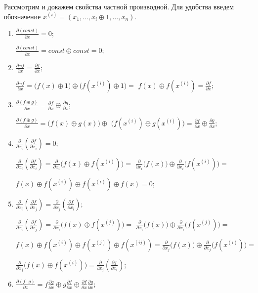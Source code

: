 Рассмотрим и докажем свойства частной производной. Для удобства введем обозначение $x^{(i)} = (x_1, \dots, x_i \oplus 1, \dots, x_n)$.
\begin{enumerate}[label=\arabic*)]
    \item $\frac{\partial (const)}{\partial x} = 0;$
    
    $\frac{\partial (const)}{\partial x} = const \oplus const = 0;$
    \item $\frac{\partial \neg f}{\partial x}=\frac{\partial f}{\partial x};$
    
    $\frac{\partial \neg f}{\partial x}= \big(f(x) \oplus 1 \big) \oplus \big(f(x^{(i)}) \oplus 1 \big) = $
    $f(x) \oplus f(x^{(i)})=\frac{\partial f}{\partial x};$
    \item $\frac{\partial\left(f \oplus g\right)}{\partial x} = \frac{\partial f}{\partial x} \oplus \frac{\partial g}{\partial x};$
    
    $\frac{\partial\left(f \oplus g\right)}{\partial x} = \big(f(x) \oplus g(x)\big) \oplus $
    $\big(f(x^{(i)}) \oplus g(x^{(i)})\big) = \frac{\partial f}{\partial x} \oplus \frac{\partial g}{\partial x};$
    \item $\frac{\partial}{\partial x_i}\left(\frac{\partial f}{\partial x_i}\right) = 0;$
    
    $\frac{\partial}{\partial x_i}\left(\frac{\partial f}{\partial x_i}\right) = \frac{\partial}{\partial x_i}\Big(f(x) \oplus f(x^{(i)})\Big) = $
    $\frac{\partial}{\partial x_i}\Big(f(x)\Big) \oplus \frac{\partial}{\partial x_i} \Big(f(x^{(i)})\Big) = $
    
    $f(x) \oplus f(x^{(i)}) \oplus f(x^{(i)}) \oplus f(x) = 0;$
    \item $\frac{\partial}{\partial x_i}\left(\frac{\partial f}{\partial x_j}\right) = \frac{\partial}{\partial x_j}\left(\frac{\partial f}{\partial x_i}\right);$
    
    $\frac{\partial}{\partial x_i}\left(\frac{\partial f}{\partial x_j}\right) = \frac{\partial}{\partial x_i}\Big(f(x) \oplus f(x^{(j)})\Big) = $
    $\frac{\partial}{\partial x_i}\Big(f(x)\Big) \oplus \frac{\partial}{\partial x_i} \Big(f(x^{(j)})\Big) = $
    
    $f(x) \oplus f(x^{(i)}) \oplus f(x^{(j)}) \oplus f(x^{(ij)}) = \frac{\partial}{\partial x_j}\Big(f(x)\Big) \oplus \frac{\partial}{\partial x_j} \Big(f(x^{(i)})\Big) = $

    $\frac{\partial}{\partial x_j}\Big(f(x) \oplus f(x^{(i)})\Big) = \frac{\partial}{\partial x_j}\left(\frac{\partial f}{\partial x_i}\right);$
    \item $\frac{\partial\left(f \cdot g\right)}{\partial x} = f\frac{\partial g}{\partial x} \oplus g\frac{\partial f}{\partial x} \oplus \frac{\partial f}{\partial x}\frac{\partial g}{\partial x};$


\end{enumerate}
